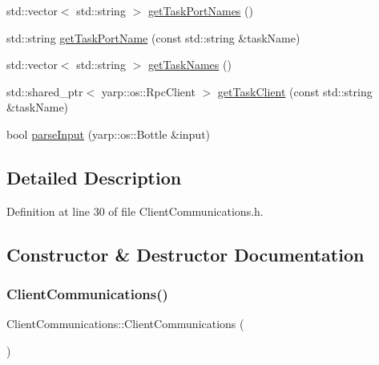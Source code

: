 \begin{DoxyCompactItemize}
\item 
std\+::vector$<$ std\+::string $>$ \hyperlink{classocra__recipes_1_1ClientCommunications_abff3747f063489056f41c99edb7e1e3b}{get\+Task\+Port\+Names} ()
\item 
std\+::string \hyperlink{classocra__recipes_1_1ClientCommunications_ab915047503c4cbddbd26c2036f8340ed}{get\+Task\+Port\+Name} (const std\+::string \&task\+Name)
\item 
std\+::vector$<$ std\+::string $>$ \hyperlink{classocra__recipes_1_1ClientCommunications_a821a74e8c4b20e1d3da18e1cf6b7e31d}{get\+Task\+Names} ()
\item 
std\+::shared\+\_\+ptr$<$ yarp\+::os\+::\+Rpc\+Client $>$ \hyperlink{classocra__recipes_1_1ClientCommunications_ad94eda2ba62336ea95b83622d0837543}{get\+Task\+Client} (const std\+::string \&task\+Name)
\item 
bool \hyperlink{classocra__recipes_1_1ClientCommunications_ae1d3d48e76010741a8d6f3622191156c}{parse\+Input} (yarp\+::os\+::\+Bottle \&input)
\end{DoxyCompactItemize}


\subsection{Detailed Description}


Definition at line 30 of file Client\+Communications.\+h.



\subsection{Constructor \& Destructor Documentation}
\hypertarget{classocra__recipes_1_1ClientCommunications_a459f2b8ffc37223b303ac0596cccdfd4}{}\label{classocra__recipes_1_1ClientCommunications_a459f2b8ffc37223b303ac0596cccdfd4} 
\subsubsection{\texorpdfstring{Client\+Communications()}{ClientCommunications()}}
{\footnotesize\ttfamily Client\+Communications\+::\+Client\+Communications (\begin{DoxyParamCaption}{ }\end{DoxyParamCaption})}



